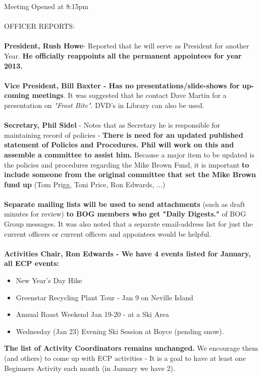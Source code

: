 \documentclass[10pt,a4paper]{article}
\begin{document}
\begin{multicols}{2}
\vspace{10pt}
Meeting Opened at 8:15pm
\\
\\
{\Large OFFICER REPORTS:}
\\
\\
\textbf{President, Rush Howe}- Reported that he will serve as President for another Year.  \textbf{He officially reappoints all the permanent appointees for year 2013.}
\\
\\
{\bf Vice President, Bill Baxter - Has no presentations/slide-shows for up-coming meetings}.  It was suggested that he contact Dave Martin for a presentation on \emph{"Frost Bite"}.
DVD's in Library can also be used.
\\
\\
{\bf Secretary, Phil Sidel} - Notes that as Secretary he is responsible for maintaining record of policies - {\bf There is need for an updated published statement of Policies and Procedures.  Phil will work on this and assemble a committee to assist him.}  Because a major item to be updated is the policies and procedures regarding the Mike Brown
Fund, it is important {\bf to include someone from the original committee that set the Mike Brown fund up} (Tom Prigg, Toni Price, Ron Edwards, ...)
\\
\\
\textbf{Separate mailing lists will be used to send attachments} (such as draft minutes for review) \textbf{to BOG members who get "Daily Digests."} of BOG Group messages.
It was also noted that a separate email-address list for just the current officers or current officers and appointees would be helpful.
\\
\\
\textbf{Activities Chair, Ron Edwards - We have 4 events listed for January, all ECP events:}
\begin{itemize}
\item   New Year's Day Hike
\item   Greenstar Recycling Plant Tour - Jan 9 on Neville Island
\item   Annual Roast Weekend Jan 19-20 - at a Ski Area
\item   Wednesday (Jan 23) Evening Ski Session at Boyce (pending snow).
\end{itemize}

\textbf{The list of Activity Coordinators remains unchanged.}
We encourage them (and others) to come up with ECP activities - It is a goal to have at least one Beginners Activity each month (in January we have 2).


\end{multicols}
\end{document}
